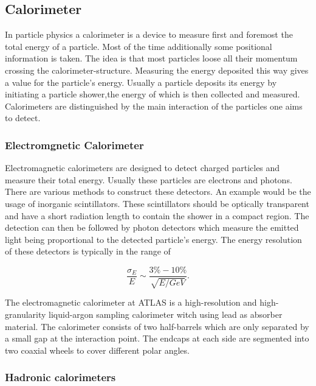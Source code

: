 

\subsection{Calorimeter}

In particle physics a calorimeter is a device to measure first and foremost the total energy of a particle. Most of the time additionally some positional information is taken.
The idea is that most particles loose all their momentum crossing the calorimeter-structure. Measuring the energy deposited this way gives a value for the particle's energy.
Usually a particle deposits its energy by initiating a particle shower,the energy of which is then collected and measured.
Calorimeters are distinguished by the main interaction of the particles one aims to detect. 
\subsubsection{Electromgnetic Calorimeter}

Electromagnetic calorimeters are designed to detect charged particles and measure their total energy. Usually these particles are electrons and photons. There are various methods to construct these detectors. An example would be the usage of inorganic scintillators. These scintillators should be optically transparent and have a short radiation length to contain the shower in a compact region. The detection can then be followed by photon detectors which measure the emitted light being proportional to the detected particle's energy. The energy resolution of these detectors is typically in the range of

\begin{equation}
\frac{\sigma_E}{E} \sim \frac{3 \% - 10 \%}{\sqrt{E/GeV}}.
\end{equation}

The electromagnetic calorimeter at ATLAS is a high-resolution and high-granularity liquid-argon sampling calorimeter witch using lead as absorber material. The calorimeter consists of two half-barrels which are only separated by a small gap at the interaction point. The endcaps at each side are segmented into two coaxial wheels to cover different polar angles.

\subsubsection{Hadronic calorimeters}

